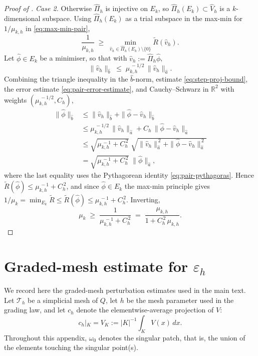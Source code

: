 \documentclass[11pt]{article}
\theoremstyle{plain}
\theoremstyle{definition}
\theoremstyle{remark}
\begin{document}
\begin{proof}[Proof of ]
\medskip
\emph{Case 2.} Otherwise $\widehat\Pi_h$ is injective on $E_k$, so
$\widehat\Pi_h(E_k)\subset\widehat V_h$ is a $k$-dimensional subspace.
Using $\widehat\Pi_h(E_k)$ as a trial subspace in the max-min for
$1/\mu_{k,h}$ in \eqref{eq:max-min-pair},
\[
  \frac{1}{\mu_{k,h}}
  \;\ge\;
  \min_{\widehat v_h\in\widehat\Pi_h(E_k)\setminus\{0\}}
  \widetilde R(\widehat v_h).
\]
Let $\widehat\phi\in E_k$ be a minimiser, so that with
$\widehat v_h:=\widehat\Pi_h\widehat\phi$,
\begin{equation}
\label{eq:step-proj-bound}
  \|\widehat v_h\|_{\widehat b}
  \;\le\; \mu_{k,h}^{\,-1/2}\,\|\widehat v_h\|_{\widehat a}.
\end{equation}
Combining the triangle inequality in the $\widehat b$-norm,
estimate \eqref{eq:step-proj-bound}, the error estimate
\eqref{eq:pair-error-estimate}, and Cauchy--Schwarz in $\mathbb R^2$
with weights $(\mu_{k,h}^{\,-1/2},C_h)$,
\begin{align*}
  \|\widehat\phi\|_{\widehat b}
  &\le \|\widehat v_h\|_{\widehat b}
      + \|\widehat\phi-\widehat v_h\|_{\widehat b} \\
  &\le \mu_{k,h}^{\,-1/2}\,\|\widehat v_h\|_{\widehat a}
      + C_h\,\|\widehat\phi-\widehat v_h\|_{\widehat a} \\
  &\le \sqrt{\mu_{k,h}^{\,-1}+C_h^{\,2}}\;
       \sqrt{\|\widehat v_h\|_{\widehat a}^{\,2}
             +\|\widehat\phi-\widehat v_h\|_{\widehat a}^{\,2}} \\
  &= \sqrt{\mu_{k,h}^{\,-1}+C_h^{\,2}}\;\|\widehat\phi\|_{\widehat a},
\end{align*}
where the last equality uses the Pythagorean identity
\eqref{eq:pair-pythagoras}. Hence
$\widetilde R(\widehat\phi)\le\mu_{k,h}^{\,-1}+C_h^{\,2}$, and since
$\widehat\phi\in E_k$ the max-min principle gives
$1/\mu_k=\min_{E_k}\widetilde R\le\widetilde R(\widehat\phi)
\le\mu_{k,h}^{\,-1}+C_h^{\,2}$. Inverting,
\[
  \mu_k \;\ge\;
  \frac{1}{\mu_{k,h}^{\,-1}+C_h^{\,2}}
  \;=\;
  \frac{\mu_{k,h}}{1+C_h^{\,2}\,\mu_{k,h}}.
\]
\end{proof}


\section{Graded-mesh estimate for \texorpdfstring{$\varepsilon_h$}{epsilon\_h}}
\label{app:graded-eps}

We record here the graded-mesh perturbation estimates used in the main text.
Let $\mathcal T_h$ be a simplicial mesh of $Q$, let $h$ be the mesh parameter
used in the grading law, and let \(c_h\) denote the elementwise-average
projection of \(V\):
\[
  c_h|_K=V_K:=|K|^{-1}\int_K V(x)\,dx .
\]
Throughout this appendix, $\omega_0$ denotes the singular patch, that is, the
union of the elements touching the singular point(s).
\end{document}
